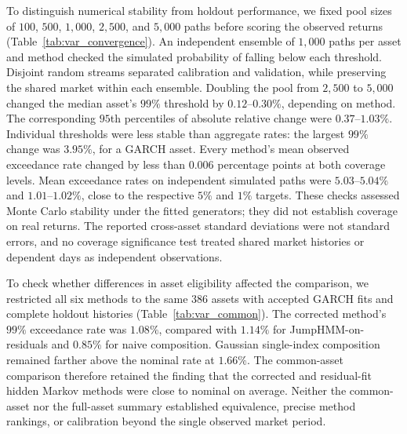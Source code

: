 To distinguish numerical stability from holdout performance, we fixed
pool sizes of $100$, $500$, $1{,}000$, $2{,}500$, and $5{,}000$ paths
before scoring the observed returns
(Table~\ref{tab:var_convergence}). An independent ensemble of
$1{,}000$ paths per asset and method checked the simulated probability
of falling below each threshold. Disjoint random streams separated
calibration and validation, while preserving the shared market within
each ensemble. Doubling the pool from $2{,}500$ to $5{,}000$ changed
the median asset's $99\%$ threshold by $0.12$--$0.30\%$, depending
on method. The corresponding $95$th percentiles of absolute relative
change were $0.37$--$1.03\%$. Individual thresholds were less stable
than aggregate rates: the largest $99\%$ change was $3.95\%$, for a
GARCH asset. Every method's mean observed exceedance rate changed by
less than $0.006$ percentage points at both coverage levels. Mean
exceedance rates on independent simulated paths were
$5.03$--$5.04\%$ and $1.01$--$1.02\%$, close to the respective
$5\%$ and $1\%$ targets. These checks assessed Monte Carlo stability
under the fitted generators; they did not establish coverage on real
returns. The reported cross-asset standard deviations were not
standard errors, and no coverage significance test treated shared
market histories or dependent days as independent observations.

\begin{table}[H]
  \centering
  \caption{\textbf{Threshold convergence and independent simulation
    checks.} Relative changes compare pooled thresholds from
    $2{,}500$ and $5{,}000$ separate $249$-day paths, divided by the
    absolute $5{,}000$-path threshold. Median and P95 denote the
    cross-asset median and $95$th percentile. Simulation rates are
    mean per-asset exceedance percentages on $1{,}000$ independent
    paths, using the $5{,}000$-path threshold. Summaries cover the
    $416$ holdout-eligible assets, or $386$ for generalized
    autoregressive conditional heteroskedasticity (GARCH).
    SIM denotes the single-index model; JumpHMM denotes the hidden
    Markov generator with jumps disabled.}
  \label{tab:var_convergence}
  \footnotesize
  \setlength{\tabcolsep}{3pt}
  
\end{table}

To check whether differences in asset eligibility affected the
comparison, we restricted all six methods to the same $386$ assets
with accepted GARCH fits and complete holdout histories
(Table~\ref{tab:var_common}). The corrected method's $99\%$
exceedance rate was $1.08\%$, compared with $1.14\%$ for
JumpHMM-on-residuals and $0.85\%$ for naive composition. Gaussian
single-index composition remained farther above the nominal rate at
$1.66\%$. The common-asset comparison therefore retained the finding
that the corrected and residual-fit hidden Markov methods were close
to nominal on average. Neither the common-asset nor the full-asset
summary established equivalence, precise method rankings, or
calibration beyond the single observed market period.

